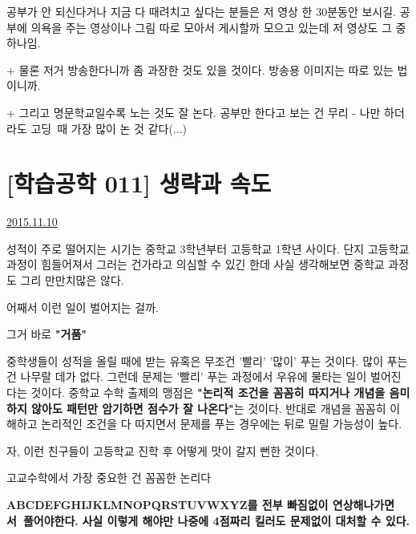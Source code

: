 공부가 안 되신다거나 지금 다 때려치고 싶다는 분들은 저 영상 한 30분동안 보시길.
공부에 의욕을 주는 영상이나 그림 따로 모아서 게시할까 모으고 있는데 저 영상도 그 중 하나임.
\vspace{5mm}

+ 물론 저거 방송한다니까 좀 과장한 것도 있을 것이다. 방송용 이미지는 따로 있는 법이니까.
\vspace{5mm}

+ 그리고 명문학교일수록 노는 것도 잘 논다. 공부만 한다고 보는 건 무리 - 나만 하더라도 고딩 때 가장 많이 논 것 같다(...)
\vspace{5mm}



\section{[학습공학 011] 생략과 속도}
\href{https://www.kockoc.com/Apoc/474136}{2015.11.10}

\vspace{5mm}

성적이 주로 떨어지는 시기는 중학교 3학년부터 고등학교 1학년 사이다.
단지 고등학교 과정이 힘들어져서 그러는 건가라고 의심할 수 있긴 한데 사실 생각해보면 중학교 과정도 그리 만만치많은 않다.
\vspace{5mm}

어째서 이런 일이 벌어지는 걸까.
\vspace{5mm}

그거 바로 \textbf{"거품"}
\vspace{5mm}

중학생들이 성적을 올릴 때에 받는 유혹은 무조건 '빨리' '많이' 푸는 것이다.
많이 푸는 건 나무랄 데가 없다. 그런데 문제는 '빨리' 푸는 과정에서 우유에 물타는 일이 벌어진다는 것이다.
중학교 수학 출제의 맹점은 \textbf{"논리적 조건을 꼼꼼히 따지거나 개념을 음미하지 않아도 패턴만 암기하면 점수가 잘 나온다"}는 것이다.
반대로 개념을 꼼꼼히 이해하고 논리적인 조건을 다 따지면서 문제를 푸는 경우에는 뒤로 밀릴 가능성이 높다.
\vspace{5mm}

자, 이런 친구들이 고등학교 진학 후 어떻게 맛이 갈지 뻔한 것이다.
\vspace{5mm}

고교수학에서 가장 중요한 건 꼼꼼한 논리다
\vspace{5mm}

\textbf{ABCDEFGHIJKLMNOPQRSTUVWXYZ를 전부 빠짐없이 연상해나가면서 풀어야한다.}
\textbf{사실 이렇게 해야만 나중에 4점짜리 킬러도 문제없이 대처할 수 있다.}
\vspace{5mm}

